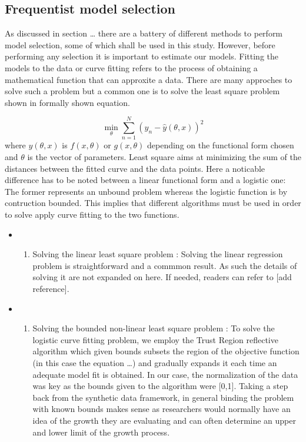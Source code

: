 \documentclass[]{article}
\providecommand{\tightlist}{%
  \setlength{\itemsep}{0pt}\setlength{\parskip}{0pt}}
\begin{document}
\hypertarget{frequentist-model-selection}{%
\subsection{Frequentist model
selection}\label{frequentist-model-selection}}

As discussed in section \ldots{} there are a battery of different
methods to perform model selection, some of which shall be used in this
study. However, before performing any selection it is important to
estimate our models. Fitting the models to the data or curve fitting
refers to the process of obtaining a mathematical function that can
approxite a data. There are many approches to solve such a problem but a
common one is to solve the least square problem shown in formally shown
equation.

\[\min_{\theta} \sum_{n=1}^{N} (y_n - \hat y(\theta,x))^2\] where
\(y(\theta,x)\) is \(f(x, \theta)\) or \(g(x, \theta)\) depending on the
functional form chosen and \(\theta\) is the vector of parameters. Least
square aims at minimizing the sum of the distances between the fitted
curve and the data points. Here a noticable difference has to be noted
between a linear functional form and a logistic one: The former
represents an unbound problem whereas the logistic function is by
contruction bounded. This implies that different algorithms must be used
in order to solve apply curve fitting to the two functions.

\begin{itemize}
\item
  \begin{enumerate}
  \def\labelenumi{(\roman{enumi})}
  \tightlist
  \item
    Solving the linear least square problem : Solving the linear
    regression problem is straightforward and a commmon result. As such
    the details of solving it are not expanded on here. If needed,
    readers can refer to {[}add reference{]}.
  \end{enumerate}
\item
  \begin{enumerate}
  \def\labelenumi{(\roman{enumi})}
  \setcounter{enumi}{1}
  \tightlist
  \item
    Solving the bounded non-linear least square problem : To solve the
    logistic curve fitting problem, we employ the Trust Region
    reflective algorithm which given bounds subsets the region of the
    objective function (in this case the equation \ldots{}) and
    gradually expands it each time an adequate model fit is obtained. In
    our case, the normalization of the data was key as the bounds given
    to the algorithm were {[}0,1{]}. Taking a step back from the
    synthetic data framework, in general binding the problem with known
    bounds makes sense as researchers would normally have an idea of the
    growth they are evaluating and can often determine an upper and
    lower limit of the growth process.
  \end{enumerate}
\end{itemize}
\end{document}
